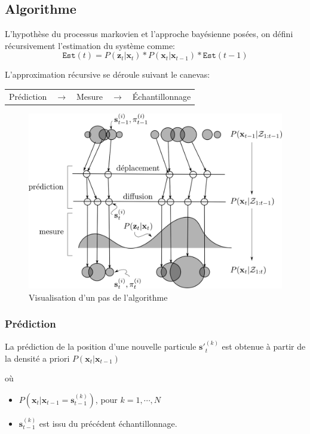 \documentclass[a4paper,11pt]{report}
\begin{document}
\subsection{Algorithme}

L'hypothèse du processus markovien et l'approche bayésienne posées, on défini récursivement l'estimation du système comme:
$$\mathtt{Est}(t) = P(\mathbf{z}_{t}|\mathbf{x}_{t})*P(\mathbf{x}_{t}|\mathbf{x}_{t-1})*\mathtt{Est}(t-1)$$

L'approximation récursive se déroule suivant le canevas:
\begin{center}
\begin{tabular}{ c c c c c } 
\cellcolor[gray]{0.9} Prédiction & $\rightarrow$ & \cellcolor[gray]{0.9} Mesure & $\rightarrow$ & \cellcolor[gray]{0.9} Échantillonnage \\  
\end{tabular} 
\end{center}

\begin{figure}[hbtp]
\centering
\includegraphics[scale=0.45]{figureCondensationAlgo.png}
\caption{Visualisation d'un pas de l'algorithme}
\end{figure}


\subsubsection{Prédiction}
La prédiction de la position d'une nouvelle particule $\mathbf{s'}_{t}^{(k)}$ est obtenue à partir de la densité a priori $P(\mathbf{x}_{t}|\mathbf{x}_{t-1})$ 

où 
\begin{itemize}
\item[] $P(\mathbf{x}_{t}|\mathbf{x}_{t-1} = \mathbf{s}_{t-1}^{(k)})$, pour $k = 1,\cdots,N$ 
\item[] $\mathbf{s}_{t-1}^{(k)}$ est issu du précédent échantillonnage.
\end{itemize}
\end{document}
